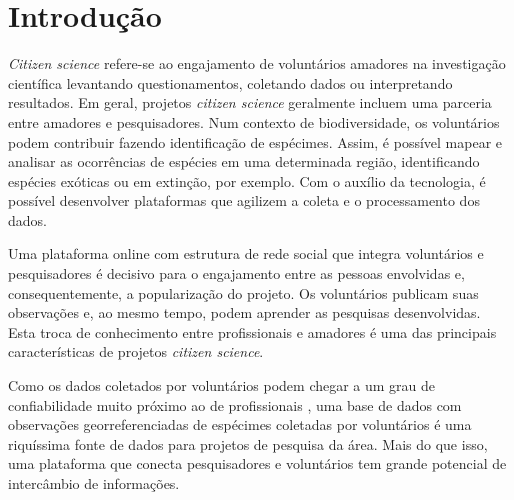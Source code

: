 \section{Introdução}
\emph{Citizen science} refere-se ao engajamento de voluntários amadores na investigação científica levantando questionamentos, coletando dados ou interpretando resultados. Em geral, projetos \emph{citizen science} geralmente incluem uma parceria entre amadores e pesquisadores. \cite{sivertown2009} Num contexto de biodiversidade, os voluntários podem contribuir fazendo identificação de espécimes. Assim, é possível mapear e analisar as ocorrências de espécies em uma determinada região, identificando espécies exóticas ou em extinção, por exemplo. \cite{miller2012} Com o auxílio da tecnologia, é possível desenvolver plataformas que agilizem a coleta e o processamento dos dados. \cite{bonney2014}

Uma plataforma online com estrutura de rede social que integra voluntários e pesquisadores é decisivo para o engajamento entre as pessoas envolvidas e, consequentemente, a popularização do projeto. Os voluntários publicam suas observações e, ao mesmo tempo, podem aprender as pesquisas desenvolvidas. Esta troca de conhecimento entre profissionais e amadores é uma das principais características de projetos \emph{citizen science}. \cite{sivertown2009}

Como os dados coletados por voluntários podem chegar a um grau de confiabilidade muito próximo ao de profissionais \cite{gollan2012, vanstrien2013}, uma base de dados com observações georreferenciadas de espécimes coletadas por voluntários é uma riquíssima fonte de dados para projetos de pesquisa da área. Mais do que isso, uma plataforma que conecta pesquisadores e voluntários tem grande potencial de intercâmbio de informações. 
